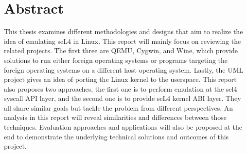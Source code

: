 \chapter*{Abstract}\label{abstract}

This thesis examines different methodologies and designs that aim to realize the idea of emulating seL4 in Linux. This report will mainly focus on reviewing the related projects. The first three are QEMU, Cygwin, and Wine, which provide solutions to run either foreign operating systems or programs targeting the foreign operating systems on a different host operating system. Lastly, the UML project gives an idea of porting the Linux kernel to the userspace. This report also proposes two approaches, the first one is to perform emulation at the sel4 syscall API layer, and the second one is to provide seL4 kernel ABI layer. They all share similar goals but tackle the problem from different perspectives. An analysis in this report will reveal similarities and differences between those techniques. Evaluation approaches and applications will also be proposed at the end to demonstrate the underlying technical solutions and outcomes of this project.